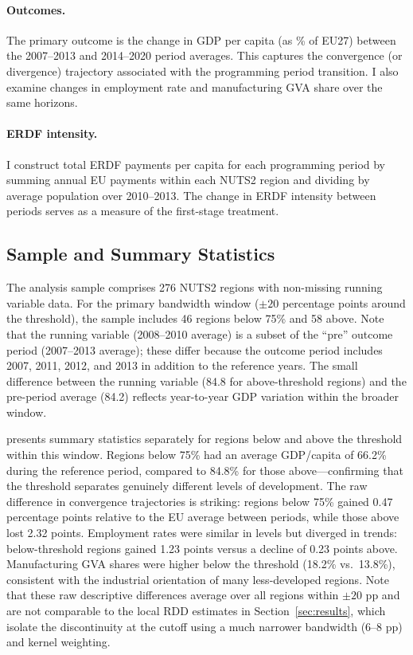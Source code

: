 \documentclass[12pt]{article}
\begin{document}
\paragraph{Outcomes.} The primary outcome is the change in GDP per capita (as \% of EU27) between the 2007--2013 and 2014--2020 period averages. This captures the convergence (or divergence) trajectory associated with the programming period transition. I also examine changes in employment rate and manufacturing GVA share over the same horizons.

\paragraph{ERDF intensity.} I construct total ERDF payments per capita for each programming period by summing annual EU payments within each NUTS2 region and dividing by average population over 2010--2013. The change in ERDF intensity between periods serves as a measure of the first-stage treatment.

\subsection{Sample and Summary Statistics}

The analysis sample comprises 276 NUTS2 regions with non-missing running variable data. For the primary bandwidth window ($\pm 20$ percentage points around the threshold), the sample includes 46 regions below 75\% and 58 above. Note that the running variable (2008--2010 average) is a subset of the ``pre'' outcome period (2007--2013 average); these differ because the outcome period includes 2007, 2011, 2012, and 2013 in addition to the reference years. The small difference between the running variable (84.8 for above-threshold regions) and the pre-period average (84.2) reflects year-to-year GDP variation within the broader window.

 presents summary statistics separately for regions below and above the threshold within this window. Regions below 75\% had an average GDP/capita of 66.2\% during the reference period, compared to 84.8\% for those above---confirming that the threshold separates genuinely different levels of development. The raw difference in convergence trajectories is striking: regions below 75\% gained 0.47 percentage points relative to the EU average between periods, while those above lost 2.32 points. Employment rates were similar in levels but diverged in trends: below-threshold regions gained 1.23 points versus a decline of 0.23 points above. Manufacturing GVA shares were higher below the threshold (18.2\% vs.\ 13.8\%), consistent with the industrial orientation of many less-developed regions. Note that these raw descriptive differences average over all regions within $\pm 20$ pp and are not comparable to the local RDD estimates in Section~\ref{sec:results}, which isolate the discontinuity at the cutoff using a much narrower bandwidth (6--8 pp) and kernel weighting.
\end{document}
